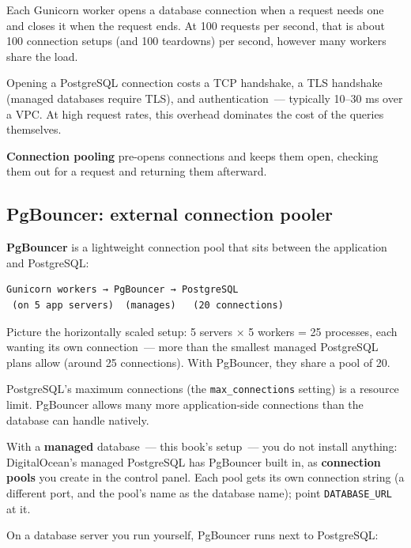 Each Gunicorn worker opens a database connection when a request needs one and closes it when the request ends. At 100 requests per second, that is about 100 connection setups (and 100 teardowns) per second, however many workers share the load.

Opening a PostgreSQL connection costs a TCP handshake, a TLS handshake (managed databases require TLS), and authentication~--- typically 10--30 ms over a VPC. At high request rates, this overhead dominates the cost of the queries themselves.

\textbf{Connection pooling} pre-opens connections and keeps them open, checking them out for a request and returning them afterward.

\subsection*{PgBouncer: external connection pooler}\label{36-scaling-load:pgbouncer-external-connection-pooler}

\textbf{PgBouncer} is a lightweight connection pool that sits between the application and PostgreSQL:

\begin{outputbox}[short]
\begin{Verbatim}[fontsize=\codesize, breaklines, breakanywhere, breaksymbolleft={\tiny\textcolor{muted}{$\hookrightarrow$}}]
Gunicorn workers → PgBouncer → PostgreSQL
 (on 5 app servers)  (manages)   (20 connections)
\end{Verbatim}
\end{outputbox}

\noindent{}Picture the horizontally scaled setup: 5 servers × 5 workers = 25 processes, each wanting its own connection~--- more than the smallest managed PostgreSQL plans allow (around 25 connections). With PgBouncer, they share a pool of 20.

PostgreSQL's maximum connections (the \texttt{max\_connections} setting) is a resource limit. PgBouncer allows many more application-side connections than the database can handle natively.

With a \textbf{managed} database~--- this book's setup~--- you do not install anything: DigitalOcean's managed PostgreSQL has PgBouncer built in, as \textbf{connection pools} you create in the control panel. Each pool gets its own connection string (a different port, and the pool's name as the database name); point \texttt{DATABASE\_URL} at it.

On a database server you run yourself, PgBouncer runs next to PostgreSQL:


